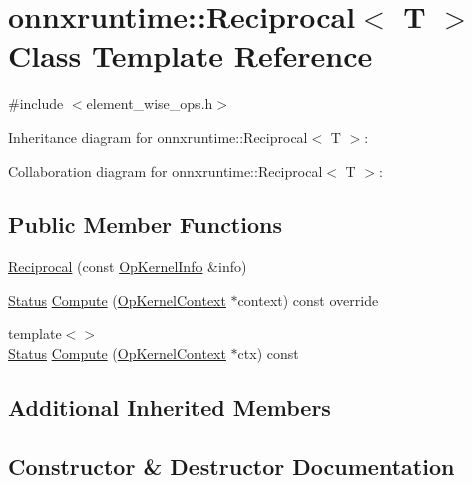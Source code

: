 \hypertarget{classonnxruntime_1_1Reciprocal}{}\section{onnxruntime\+:\+:Reciprocal$<$ T $>$ Class Template Reference}
\label{classonnxruntime_1_1Reciprocal}


{\ttfamily \#include $<$element\+\_\+wise\+\_\+ops.\+h$>$}



Inheritance diagram for onnxruntime\+:\+:Reciprocal$<$ T $>$\+:


Collaboration diagram for onnxruntime\+:\+:Reciprocal$<$ T $>$\+:
\subsection*{Public Member Functions}
\begin{DoxyCompactItemize}
\item 
\mbox{\hyperlink{classonnxruntime_1_1Reciprocal_ab5f7b88e2f4c1957a9beeb560d343b39}{Reciprocal}} (const \mbox{\hyperlink{classonnxruntime_1_1OpKernelInfo}{Op\+Kernel\+Info}} \&info)
\item 
\mbox{\hyperlink{classonnxruntime_1_1common_1_1Status}{Status}} \mbox{\hyperlink{classonnxruntime_1_1Reciprocal_ae5eea4f44bee7a620e4d4ce512b8a17a}{Compute}} (\mbox{\hyperlink{classonnxruntime_1_1OpKernelContext}{Op\+Kernel\+Context}} $\ast$context) const override
\item 
{\footnotesize template$<$$>$ }\\\mbox{\hyperlink{classonnxruntime_1_1common_1_1Status}{Status}} \mbox{\hyperlink{classonnxruntime_1_1Reciprocal_a2d51e18f1fcbc3f5dc8a629ac3b43e36}{Compute}} (\mbox{\hyperlink{classonnxruntime_1_1OpKernelContext}{Op\+Kernel\+Context}} $\ast$ctx) const
\end{DoxyCompactItemize}
\subsection*{Additional Inherited Members}


\subsection{Constructor \& Destructor Documentation}
\mbox{\label{classonnxruntime_1_1Reciprocal_ab5f7b88e2f4c1957a9beeb560d343b39}} 
